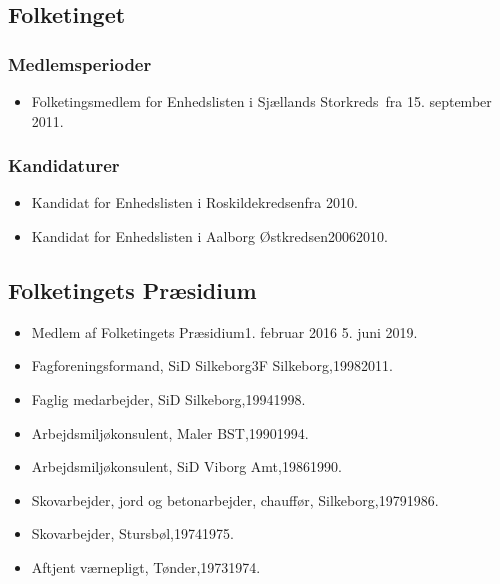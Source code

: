 \documentclass[11pt, a4paper]{awesome-cv}
\begin{document}
\begin{cvletter}
\subsection*{Folketinget}
\subsubsection*{Medlemsperioder}
\begin{itemize}
\item Folketingsmedlem for Enhedslisten i Sjællands Storkreds fra 15. september 2011.
\end{itemize}
\subsubsection*{Kandidaturer}
\begin{itemize}
\item Kandidat for Enhedslisten i Roskildekredsenfra 2010.
\item Kandidat for Enhedslisten i Aalborg Østkredsen20062010.
\end{itemize}
\subsection*{Folketingets Præsidium}
\begin{itemize}
\item Medlem af Folketingets Præsidium1. februar 2016  5. juni 2019.
\end{itemize}
\begin{itemize}
\item Fagforeningsformand, SiD Silkeborg3F Silkeborg,19982011.
\item Faglig medarbejder, SiD Silkeborg,19941998.
\item Arbejdsmiljøkonsulent, Maler BST,19901994.
\item Arbejdsmiljøkonsulent, SiD Viborg Amt,19861990.
\item Skovarbejder, jord og betonarbejder, chauffør, Silkeborg,19791986.
\item Skovarbejder, Stursbøl,19741975.
\item Aftjent værnepligt, Tønder,19731974.
\end{itemize}
\end{cvletter}
\end{document}
